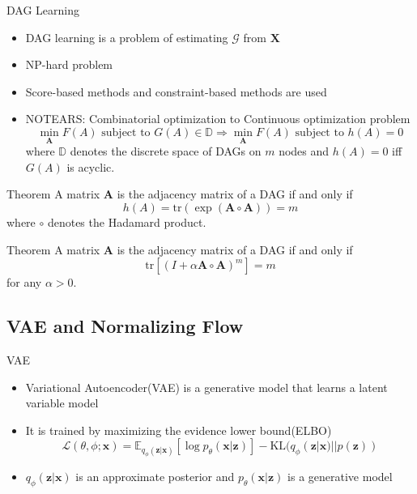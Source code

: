 \documentclass{beamer}
\begin{document}
\begin{frame}[allowframebreaks]{DAG Learning}
    \begin{itemize}
        \item DAG learning is a problem of estimating $\mathcal G$ from $\mathbf X$
        \item NP-hard problem \cite{ChickeringNPhard}
        \item Score-based methods \cite{Spirtes2000} and constraint-based methods \cite{ChickeringGES} are used
        \item NOTEARS\cite{zheng2018dags}: Combinatorial optimization to Continuous optimization problem
        \begin{equation*}
            \min_{\mathbf{A}} F(A) \text{ subject to } G(A) \in \mathbb{D} \Rightarrow 
            \min_{\mathbf{A}} F(A) \text{ subject to } h(A)=0
        \end{equation*}
        where $\mathbb D$ denotes the discrete space of DAGs on $m$ nodes and $h(A)=0$ iff $G(A)$ is acyclic.
    \end{itemize}

    \begin{block}{Theorem}
        A matrix $\mathbf A$ is the adjacency matrix of a DAG if and only if
        \begin{equation*}
            h(A) = \mathrm{tr}(\exp(\mathbf A \circ \mathbf A)) = m
        \end{equation*}
        where $\circ$ denotes the Hadamard product.
    \end{block}
    \begin{block}{Theorem}
        A matrix $\mathbf A$ is the adjacency matrix of a DAG if and only if
        \begin{equation*}
            \mathrm{tr}[(I + \alpha \mathbf A \circ \mathbf A)^m] = m
        \end{equation*}
        for any $\alpha>0$.
    \end{block}
\end{frame}

\subsection{VAE and Normalizing Flow}

\begin{frame}{VAE}
    \begin{itemize}
        \item Variational Autoencoder(VAE) is a generative model that learns a latent variable model
        \item It is trained by maximizing the evidence lower bound(ELBO)
        \begin{equation*}
            \mathcal L(\theta, \phi; \mathbf x) = \mathbb E_{q_\phi(\mathbf z | \mathbf x)}[\log p_\theta(\mathbf x | \mathbf z)] - \text{KL}(q_\phi(\mathbf z | \mathbf x) || p(\mathbf z))
        \end{equation*}
        \item $q_\phi(\mathbf z | \mathbf x)$ is an approximate posterior and $p_\theta(\mathbf x | \mathbf z)$ is a generative model
    \end{itemize}
\end{frame}
\end{document}
